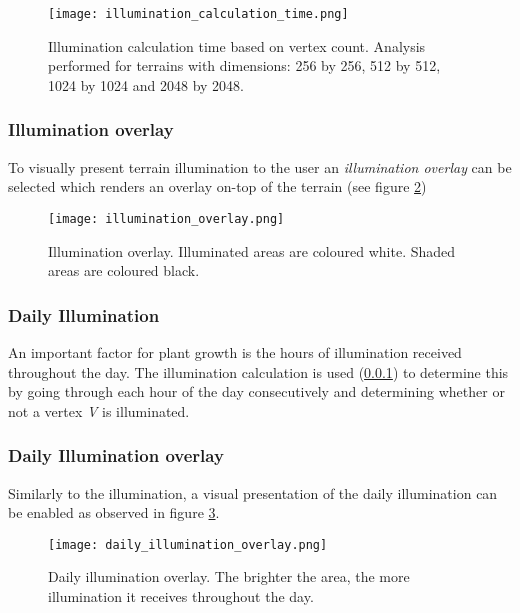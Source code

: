 \begin{figure}
\center
	\texttt{[image: illumination\_calculation\_time.png]}
	\caption{ Illumination calculation time based on vertex count. Analysis performed for terrains with dimensions: 256 by 256, 512 by 512, 1024 by 1024 and 2048 by 2048. }
	\label{fig:illumination_calculation_time}
\end{figure}

\subsubsection{Illumination overlay} \label{subsub:illumination}

To visually present terrain illumination to the user an \textit{illumination overlay} can be selected which renders an overlay on-top of the terrain (see figure \ref{fig:overlay_illumination})

\begin{figure}
\center
	\texttt{[image: illumination\_overlay.png]}
	\caption{ Illumination overlay. Illuminated areas are coloured white. Shaded areas are coloured black. }
	\label{fig:overlay_illumination}
\end{figure}

\subsubsection{Daily Illumination}

An important factor for plant growth is the hours of illumination received throughout the day. The illumination calculation is used (\ref{subsub:illumination}) to determine this by going through each hour of the day consecutively and determining whether or not a vertex \textit{V} is illuminated. 

\subsubsection{Daily Illumination overlay}

Similarly to the illumination, a visual presentation of the daily illumination can be enabled as observed in figure \ref{fig:overlay_daily_illumination}.

\begin{figure}
\center
	\texttt{[image: daily\_illumination\_overlay.png]}
	\caption{ Daily illumination overlay. The brighter the area, the more illumination it receives throughout the day. }
	\label{fig:overlay_daily_illumination}
\end{figure}

